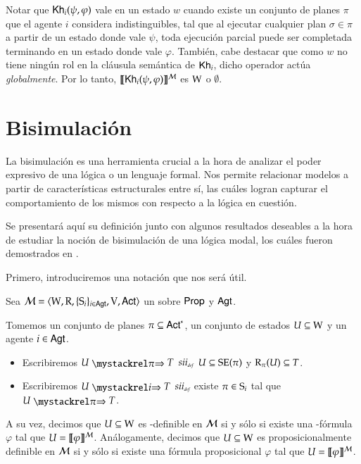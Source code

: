 Notar que $\khi(\psi,\varphi)$ vale en un estado $w$ cuando existe un conjunto de planes $\pi$ que el agente $i$ considera indistinguibles, tal que al ejecutar cualquier plan $\sigma \in \pi$ a partir de un estado donde vale $\psi$,
toda ejecución parcial puede ser completada terminando en un estado donde vale $\varphi$. También, cabe destacar que como $w$ no tiene ningún rol en la cláusula semántica de $\khi$,
dicho operador actúa \emph{globalmente}. Por lo tanto, $\truthset{\modults}{\khi(\psi,\varphi)}$ es $\W$ o $\emptyset$.


\section{Bisimulación}

La bisimulación es una herramienta crucial a la hora de analizar el poder expresivo de una lógica o un lenguaje formal. 
Nos permite relacionar modelos a partir de características estructurales entre sí, las cuáles logran capturar el comportamiento de 
los mismos con respecto a la lógica en cuestión. 

Se presentará aquí su definición junto con algunos resultados deseables a la hora de estudiar la noción de bisimulación de una 
lógica modal, los cuáles fueron demostrados en \cite{ArecesFSV25,SaraviaPHD}.

Primero, introduciremos una notación que nos será útil.

\begin{definicion}
    Sea $\model=\tup{\W,\R,\cset{\S_i}_{i \in \AGT},\V,\ACT}$ un \ults sobre $\PROP$ y $\AGT$.

    Tomemos un conjunto de planes $\pi \subseteq \ACT^*$, un conjunto de estados $U \subseteq \W$ y un agente $i \in \AGT$.
    \begin{itemize}
        \item Escribiremos $U \ultsExecStrat{\pi} T$ $\iffdef$ $U \subseteq \sexec(\pi)$ y $\R_\pi(U) \subseteq T$.
        \item Escribiremos $U \ultsExecAgi T$ $\iffdef$ existe $\pi \in \S_i$ tal que $U \ultsExecStrat{\pi} T$.
    \end{itemize}
    A su vez, decimos que $U \subseteq \W$ es \KHilogic-definible en $\modults$ si y sólo si existe una \KHilogic-fórmula $\varphi$ tal que
    $U = \truthset{\modults}{\varphi}$. Análogamente, decimos que $U \subseteq \W$ es proposicionalmente definible en $\modults$ 
    si y sólo si existe una fórmula proposicional $\varphi$ tal que $U = \truthset{\modults}{\varphi}$.
\end{definicion}

